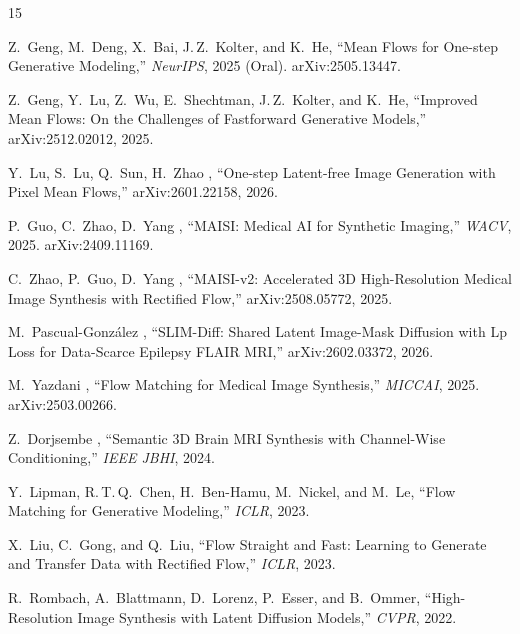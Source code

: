 \begingroup
\renewcommand{\section}[2]{}  %
\begin{thebibliography}{15}

Z.~Geng, M.~Deng, X.~Bai, J.\,Z.~Kolter, and K.~He,
``Mean Flows for One-step Generative Modeling,''
\emph{NeurIPS}, 2025 (Oral). arXiv:2505.13447.

Z.~Geng, Y.~Lu, Z.~Wu, E.~Shechtman, J.\,Z.~Kolter, and K.~He,
``Improved Mean Flows: On the Challenges of Fastforward Generative Models,''
arXiv:2512.02012, 2025.

Y.~Lu, S.~Lu, Q.~Sun, H.~Zhao \etal,
``One-step Latent-free Image Generation with Pixel Mean Flows,''
arXiv:2601.22158, 2026.

P.~Guo, C.~Zhao, D.~Yang \etal,
``MAISI: Medical AI for Synthetic Imaging,''
\emph{WACV}, 2025. arXiv:2409.11169.

C.~Zhao, P.~Guo, D.~Yang \etal,
``MAISI-v2: Accelerated 3D High-Resolution Medical Image Synthesis with
Rectified Flow,''
arXiv:2508.05772, 2025.

M.~Pascual-Gonz\'{a}lez \etal,
``SLIM-Diff: Shared Latent Image-Mask Diffusion with Lp Loss for Data-Scarce
Epilepsy FLAIR MRI,''
arXiv:2602.03372, 2026.

M.~Yazdani \etal,
``Flow Matching for Medical Image Synthesis,''
\emph{MICCAI}, 2025. arXiv:2503.00266.

Z.~Dorjsembe \etal,
``Semantic 3D Brain MRI Synthesis with Channel-Wise Conditioning,''
\emph{IEEE JBHI}, 2024.

Y.~Lipman, R.\,T.\,Q.~Chen, H.~Ben-Hamu, M.~Nickel, and M.~Le,
``Flow Matching for Generative Modeling,''
\emph{ICLR}, 2023.

X.~Liu, C.~Gong, and Q.~Liu,
``Flow Straight and Fast: Learning to Generate and Transfer Data with Rectified
Flow,''
\emph{ICLR}, 2023.

R.~Rombach, A.~Blattmann, D.~Lorenz, P.~Esser, and B.~Ommer,
``High-Resolution Image Synthesis with Latent Diffusion Models,''
\emph{CVPR}, 2022.


\end{thebibliography}

